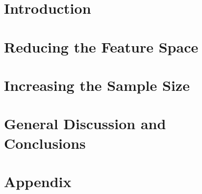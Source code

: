 \documentclass[11pt,paper=B5,twoside,openright,titlepage,
               headinclude,,footinclude,BCOR5mm,
               numbers=noenddot,cleardoublepage=empty,
               tablecaptionabove]{scrreprt}
\begin{document}
\pagestyle{plain}


\cleardoublepage

\cleardoublepage
\cleardoublepage
%
\pagestyle{scrheadings} 
\cleardoublepage

\cleardoublepage
{}

\cleardoublepage
\part{Introduction}




\cleardoublepage
\part{Reducing the Feature Space}\label{part:feature}




\cleardoublepage
\part{Increasing the Sample Size}\label{part:increase}



\cleardoublepage
\part{General Discussion and Conclusions}\label{part:dicussion}


\appendix
\part{Appendix}


\cleardoublepage
\end{document}
